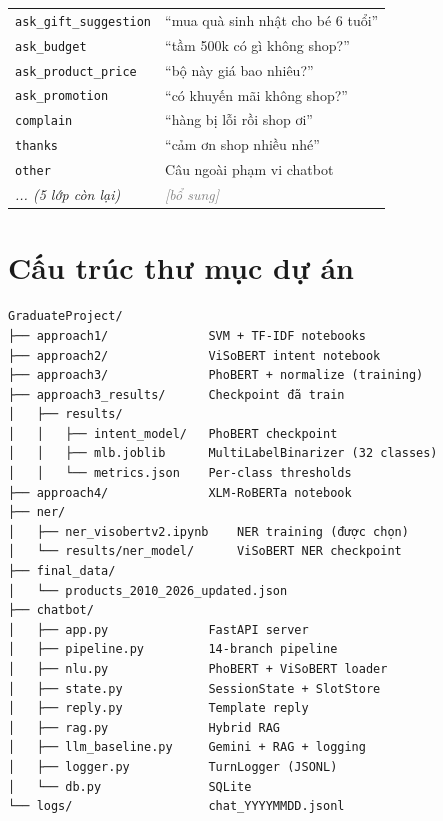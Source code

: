 \documentclass[12pt, a4paper]{report}
\newcommand{\placeholder}[1]{\textit{\textcolor{gray}{[#1]}}}
\begin{document}
\begin{longtable}{lX}
\texttt{ask\_gift\_suggestion}       & ``mua quà sinh nhật cho bé 6 tuổi'' \\
\texttt{ask\_budget}                 & ``tầm 500k có gì không shop?'' \\
\texttt{ask\_product\_price}         & ``bộ này giá bao nhiêu?'' \\
\texttt{ask\_promotion}              & ``có khuyến mãi không shop?'' \\
\texttt{complain}                    & ``hàng bị lỗi rồi shop ơi'' \\
\texttt{thanks}                      & ``cảm ơn shop nhiều nhé'' \\
\texttt{other}                       & Câu ngoài phạm vi chatbot \\
\textit{... (5 lớp còn lại)}         & \placeholder{bổ sung} \\
\end{longtable}

\chapter{Cấu trúc thư mục dự án}
\label{app:structure}

\begin{lstlisting}
GraduateProject/
├── approach1/              SVM + TF-IDF notebooks
├── approach2/              ViSoBERT intent notebook
├── approach3/              PhoBERT + normalize (training)
├── approach3_results/      Checkpoint đã train
│   ├── results/
│   │   ├── intent_model/   PhoBERT checkpoint
│   │   ├── mlb.joblib      MultiLabelBinarizer (32 classes)
│   │   └── metrics.json    Per-class thresholds
├── approach4/              XLM-RoBERTa notebook
├── ner/
│   ├── ner_visobertv2.ipynb    NER training (được chọn)
│   └── results/ner_model/      ViSoBERT NER checkpoint
├── final_data/
│   └── products_2010_2026_updated.json
├── chatbot/
│   ├── app.py              FastAPI server
│   ├── pipeline.py         14-branch pipeline
│   ├── nlu.py              PhoBERT + ViSoBERT loader
│   ├── state.py            SessionState + SlotStore
│   ├── reply.py            Template reply
│   ├── rag.py              Hybrid RAG
│   ├── llm_baseline.py     Gemini + RAG + logging
│   ├── logger.py           TurnLogger (JSONL)
│   └── db.py               SQLite
└── logs/                   chat_YYYYMMDD.jsonl
\end{lstlisting}
\end{document}
